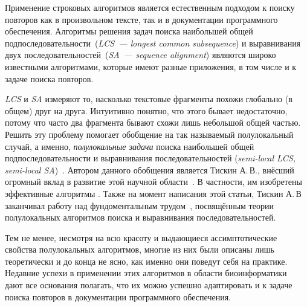 
Применение строковых алгоритмов является %
естественным подходом к поиску повторов как в произвольном тексте, так и в документации программного обеспечения.
Алгоритмы решения задач поиска наибольшей общей подпоследовательности~(\emph{LCS~--- longest common subsequence}) и выравнивания двух последовательностей~(\emph{SA~--- sequence alignment}) являются широко известными алгоритмами, которые имеют разные приложения, в том числе и к задаче поиска повторов.

\emph{LCS} и \emph{SA} измеряют то, насколько текстовые фрагменты похожи глобально (в общем) друг на друга. 
Интуитивно понятно, что этого бывает недостаточно, потому что часто два фрагмента бывают схожи лишь небольшой общей частью.
Решить эту проблему помогает обобщение на так называемый полулокальный случай, а именно, \emph{полулокальные задачи} поиска наибольшей общей подпоследовательности и выравнивания последовательностей (\emph{semi-local LCS, semi-local SA})~\cite{tiskin2006all}.
Автором данного обобщения является Тискин А.\,В., внёсший огромный вклад в развитие этой научной области~\cite{tiskin2015fast,tiskin2019bounded,krusche2009parallel,tiskin2006longest,tiskin2008semi,tiskin2011towards}.
В частности, им изобретены эффективные алгоритмы .
Также на момент написания этой статьи, Тискин А.\,В заканчивал работу над фундоментальным трудом~\cite{tiskin2006all}, посвящённым теории полулокальных алгоритмов поиска и выравнивания последовательностей.


Тем не менее, несмотря на всю красоту и выдающиеся ассимптотические свойства полулокальных алгоритмов, многие из них были описаны лишь теоретически и до конца не ясно, как именно они поведут себя на практике.
Недавние успехи в применении этих алгоритмов в области биоинформатики~\cite{baxter2012conserved,davies2015analysis, picot2010evolutionary} дают все основания полагать, что их можно успешно адаптировать и к задаче поиска повторов в документации программного обеспечения.

